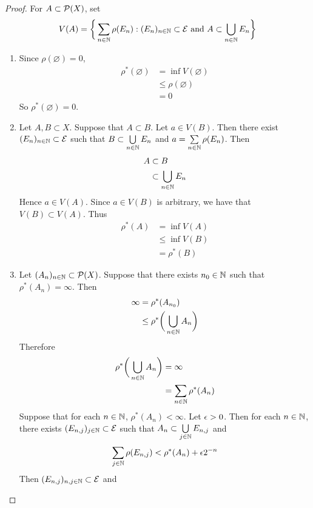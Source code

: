 \documentclass{book}
\begin{document}
	\begin{proof}For $A \subset \mathcal{P}(X)$, set 
		$$V(A) = \bigg \{\sum\limits_{n \in \mathbb{N}}\rho(E_n): (E_n)_{n \in \mathbb{N}} \subset \mathcal{E} \text{ and }A \subset \bigcup_{n \in \mathbb{N}}E_n \bigg \}$$
		\begin{enumerate}
			\item Since $\rho(\varnothing) = 0$, 
			\begin{align*}
				\rho^*(\varnothing) 
				& =  \inf V(\varnothing) \\
				& \leq \rho(\varnothing) \\
				& = 0
			\end{align*}
			So $\rho^*(\varnothing) = 0$.
			\item Let $A,B \subset X$. Suppose that $A \subset B$. Let $a \in V(B)$. Then there exist $(E_n)_{n \in \mathbb{N}} \subset \mathcal{E}$ such that $B \subset \bigcup\limits_{n \in \mathbb{N}} E_n$ and $a = \sum\limits_{n \in \mathbb{N}} \rho(E_n)$. Then 
			\begin{align*}
				A
				& \subset B \\
				& \subset  \bigcup\limits_{n \in \mathbb{N}} E_n \\
			\end{align*}
			Hence $a \in V(A)$. Since $a \in V(B)$ is arbitrary, we have that $V(B) \subset V(A)$. Thus 
			\begin{align*}
				\rho^*(A)
				& = \inf V(A) \\
				& \leq \inf V(B) \\
				& = \rho^*(B)
			\end{align*}
			\item Let $(A_n)_{n \in \mathbb{N}} \subset \mathcal{P}(X)$. Suppose that there exists $n_0 \in \mathbb{N}$ such that $\rho^*(A_n)= \infty$. Then 
			\begin{align*}
				\infty 
				& = \rho^*(A_{n_0}) \\
				& \leq \rho^*\bigg(  \bigcup\limits_{n \in \mathbb{N}}A_n \bigg)
			\end{align*}
			Therefore
			\begin{align*}
				\rho^* \bigg( \bigcup_{n \in \mathbb{N}} A_n \bigg)
				& = \infty \\
				& = \sum\limits_{n \in \mathbb{N}} \rho^*(A_n)
			\end{align*}
			Suppose that for each $n \in \mathbb{N}$, $\rho^*(A_n) < \infty$. Let $\epsilon > 0$. Then for each $n \in \mathbb{N}$, there exists $(E_{n,j})_{j \in \mathbb{N}} \subset \mathcal{E}$ such that $A_n \subset \bigcup\limits_{j \in \mathbb{N}} E_{n,j}$ and
			$$\sum\limits_{j \in \mathbb{N}} \rho(E_{n,j}) < \rho^*(A_n) + \epsilon2^{-n}$$
			Then $(E_{n,j})_{n,j \in \mathbb{N}} \subset \mathcal{E}$ and 

\end{enumerate}
\end{proof}
\end{document}
